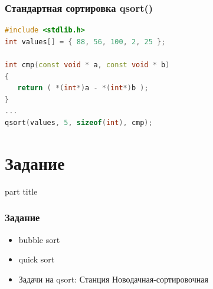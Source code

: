 \documentclass[14pt,pdf,hyperref={unicode}]{beamer}
\begin{document}
\begin{frame}[fragile]
\frametitle{Стандартная сортировка qsort()} 
\begin{lstlisting}[language=C++,basicstyle=\ttfamily,keywordstyle=\color{blue}]
#include <stdlib.h>
int values[] = { 88, 56, 100, 2, 25 };

int cmp(const void * a, const void * b)
{
   return ( *(int*)a - *(int*)b );
}
...
qsort(values, 5, sizeof(int), cmp);

\end{lstlisting}
\end{frame}




\section{Задание}
\begin{frame}
\begin{center}
\begin{beamercolorbox}[sep=8pt,center]{part
title}
\insertsection
\end{beamercolorbox}
\end{center}
\end{frame}

\begin{frame}[fragile]
\frametitle{Задание} 
\begin{itemize}
\item bubble sort
\item quick sort
\item Задачи на qsort: Станция Новодачная-сортировочная
\end{itemize}
\end{frame}
\end{document}
